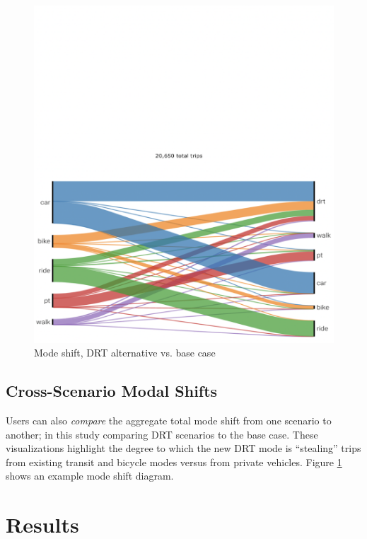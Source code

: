 \begin{figure}[ht]
\begin{minipage}[c]{0.45\textwidth}
     \includegraphics[width=\linewidth]{chapters/22-avov/images/fig-mode-share.png}
     \caption{Mode shift, DRT alternative vs. base case}
     \label{fig:avov-modeshift}
  \end{minipage}
\end{figure}

\subsection{Cross-Scenario Modal Shifts}
\label{avov-mode-shifts}

Users can also \emph{compare} the aggregate total mode shift from one scenario to another; in this study comparing DRT scenarios to the base case. These visualizations highlight the degree to which the new DRT mode is ``stealing'' trips from existing transit and bicycle modes versus from private vehicles. Figure \ref{fig:avov-modeshift} shows an example mode shift diagram.

\section{Results}
\label{avov-results}

